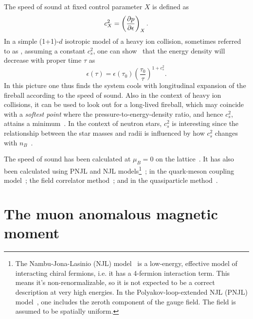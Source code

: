 The speed of sound at fixed control parameter $X$ is defined as
\begin{equation}
  c_X^2=\left(\pdv{p}{\epsilon}\right)_X.
\end{equation}
In a simple (1+1)-$d$ isotropic model of a heavy ion collision, 
sometimes referred to as , 
assuming a constant $c_s^2$, one can show~\cite{bjorken_highly_1983} 
that the energy density will decrease with proper time $\tau$ as
\begin{equation}
  \epsilon(\tau)=\epsilon(\tau_0)\left(\frac{\tau_0}{\tau}\right)^{1+c_s^2}.
\end{equation}
In this picture one thus finds the system cools with longitudinal expansion
of the fireball according to the speed of sound. %
Also in the context of heavy ion collisions, it can be used to look out
for a long-lived fireball, which may coincide with a {\it softest point}
 where the pressure-to-energy-density ratio,
and hence $c_s^2$, attains a minimum~\cite{hung_hydrodynamics_1995}.
In the context of neutron stars, $c_s^2$ is interesting since the relationship
between the star masses and radii is influenced by how $c_s^2$ changes with
$n_B$~\cite{ozel_masses_2016}.

The speed of sound has been calculated at $\mu_B=0$ on the 
lattice~\cite{borsanyi_qcd_2010,bazavov_equation_2014,borsanyi_full_2014}.
It has also been calculated using PNJL and NJL 
models\footnote{The Nambu-Jona-Lasinio (NJL)
model~\cite{nambu_dynamical_1961,nambu_dynamical_1961-1} is a low-energy,
effective model of interacting chiral fermions, i.e. it has a 4-fermion
interaction term. This means it's non-renormalizable, so it is not expected
to be a correct description at very high energies.
In the Polyakov-loop-extended NJL (PNJL) model~\cite{meisinger_chiral_1996}, 
one includes the zeroth component of the gauge field. The field is assumed to
be spatially uniform.}~\cite{ghosh_susceptibilities_2006,marty_transport_2013,deb_estimating_2016,motta_isentropic_2020,zhao_thermodynamic_2020};
in the quark-meson coupling
model~\cite{schaefer_thermodynamics_2010,abhishek_transport_2018};
the field correlator
method~\cite{khaidukov_speed_2018,khaidukov_thermodynamics_2019};
and in the quasiparticle method~\cite{mykhaylova_impact_2021}.

\section{The muon anomalous magnetic moment}\label{sec:muonAnom}

